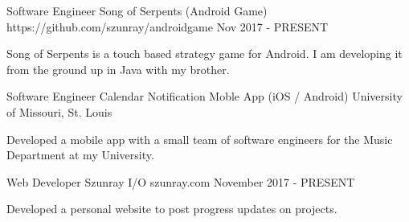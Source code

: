 

\vspace{-1mm}

\begin{cventries}


\cventry
{Software Engineer} %
{Song of Serpents (Android Game)} %
{https://github.com/szunray/androidgame} %
{Nov 2017 - PRESENT} %
{ %
\begin{cvitems}
\item {Song of Serpents is a touch based strategy game for Android. I am developing it from the ground up in Java with my brother. }
\end{cvitems}
}


\cventry
{Software Engineer} %
{Calendar Notification Moble App (iOS / Android)} %
{University of Missouri, St. Louis} %
{} %
{ %
\begin{cvitems}
\item {Developed a mobile app with a small team of software engineers for the Music Department at my University.} 
\end{cvitems}
}


\cventry
{Web Developer} %
{Szunray I/O} %
{szunray.com} %
{November 2017 - PRESENT} %
{ %
\begin{cvitems}
\item {Developed a personal website to post progress updates on projects.} 
\end{cvitems}
}


\end{cventries}
